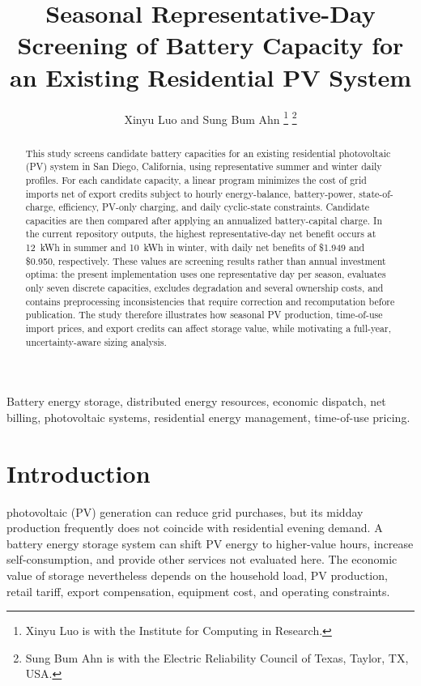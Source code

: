 \documentclass[journal]{IEEEtran}
\begin{document}
\title{Seasonal Representative-Day Screening of Battery Capacity for an Existing Residential PV System}

\author{Xinyu Luo and Sung Bum Ahn%
\thanks{Xinyu Luo is with the Institute for Computing in Research.}%
\thanks{Sung Bum Ahn is with the Electric Reliability Council of Texas, Taylor, TX, USA.}%
}

\maketitle

\begin{abstract}
This study screens candidate battery capacities for an existing residential photovoltaic (PV) system in San Diego, California, using representative summer and winter daily profiles. For each candidate capacity, a linear program minimizes the cost of grid imports net of export credits subject to hourly energy-balance, battery-power, state-of-charge, efficiency, PV-only charging, and daily cyclic-state constraints. Candidate capacities are then compared after applying an annualized battery-capital charge. In the current repository outputs, the highest representative-day net benefit occurs at 12~kWh in summer and 10~kWh in winter, with daily net benefits of \$1.949 and \$0.950, respectively. These values are screening results rather than annual investment optima: the present implementation uses one representative day per season, evaluates only seven discrete capacities, excludes degradation and several ownership costs, and contains preprocessing inconsistencies that require correction and recomputation before publication. The study therefore illustrates how seasonal PV production, time-of-use import prices, and export credits can affect storage value, while motivating a full-year, uncertainty-aware sizing analysis.
\end{abstract}

\begin{IEEEkeywords}
Battery energy storage, distributed energy resources, economic dispatch, net billing, photovoltaic systems, residential energy management, time-of-use pricing.
\end{IEEEkeywords}

\section{Introduction}
 photovoltaic (PV) generation can reduce grid purchases, but its midday production frequently does not coincide with residential evening demand. A battery energy storage system can shift PV energy to higher-value hours, increase self-consumption, and provide other services not evaluated here. The economic value of storage nevertheless depends on the household load, PV production, retail tariff, export compensation, equipment cost, and operating constraints.
\end{document}
